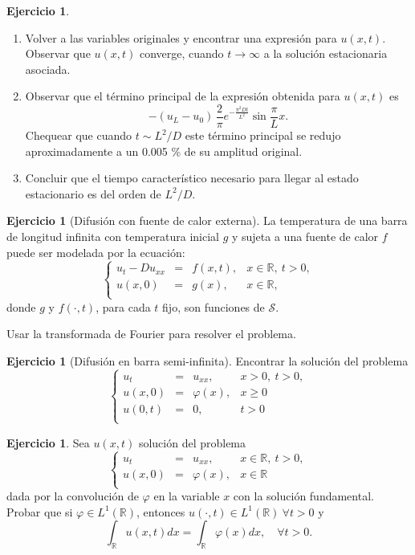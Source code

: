 \documentclass[12pt, a4paper]{amsbook}
\newcommand{\R}{{\mathbb R}}
\theoremstyle{remark}
\theoremstyle{definition}
\newtheorem{ejer}[teo]{Ejercicio}
\numberwithin{section}{chapter}
\numberwithin{subsection}{section}
\numberwithin{equation}{section}
\numberwithin{figure}{chapter}
\begin{document}
\begin{ejer}
\begin{enumerate}
\item Volver a las variables originales y encontrar una expresión para $u(x,t)$. Observar que $u(x,t)$ converge, cuando $t\to\infty$ a la solución estacionaria asociada.

\item Observar que el término principal de la expresión obtenida para $u(x,t)$ es
$$
-(u_L-u_0)\,\frac{2}{\pi} e^{-\frac{\pi^2 D t}{L^2}}\sin \frac{\pi}{L} x.
$$
Chequear que cuando $t\sim L^2/D$ este término principal se redujo aproximadamente a un 0.005 \% de su amplitud original.

\item Concluir que el tiempo característico necesario para llegar al estado estacionario es del orden de $L^2/D$.
\end{enumerate}
\end{ejer}

\begin{ejer}[Difusión con fuente de calor externa] La temperatura de una barra de longitud infinita con temperatura inicial $g$ y sujeta a una fuente de calor $f$ puede ser modelada por la ecuación:
$$\left\{\begin{array}{rcll}
u_t - D u_{xx} & = & f(x,t), & x\in \R,\ t>0,\\
u(x,0) & = & g(x), & x\in \R,\\
\end{array}\right.$$
donde $g$ y $f(\cdot,t)$, para cada $t$ fijo, son funciones de $\mathcal S$.

Usar la transformada de Fourier para resolver el problema.
\end{ejer}

\begin{ejer}[Difusión en barra semi-infinita] Encontrar la solución del problema
$$\left\{\begin{array}{rcll}
u_t & = & u_{xx}, & x>0,\ t>0,\\
u(x,0) & = & \varphi(x), & x\geq 0\\
u(0,t) & = & 0, & t> 0\\
\end{array}\right.$$
\end{ejer}

\begin{ejer} Sea $u(x,t)$ solución del problema
$$\left\{\begin{array}{rcll}
u_t & = & u_{xx}, & x\in \R,\ t>0,\\
u(x,0) & = & \varphi(x), & x\in \R\\
\end{array}\right.$$
dada por la convolución de $\varphi$ en la variable $x$ con la solución
fundamental. Probar que si $\varphi\in L^1(\R)$, entonces $u(\cdot,t)\in
L^1(\R)\ \forall t>0$ y
$$\int_{\R} u(x,t) dx = \int_{\R} \varphi(x) dx,\quad \forall t>0.$$
\end{ejer}
\end{document}
